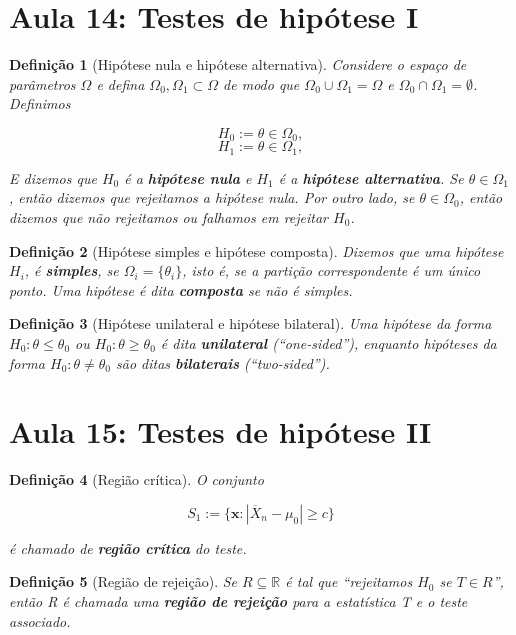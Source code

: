 \documentclass{article}
\newtheorem{definition}{Definição}
\begin{document}
\section*{Aula 14: Testes de hipótese I}
\label{s14}
\begin{definition}[Hipótese nula e hipótese alternativa]
Considere o espaço de parâmetros $\Omega$ e defina $\Omega_0, \Omega_1 \subset \Omega$ de modo que $\Omega_0 \cup \Omega_1 = \Omega$ e $\Omega_0 \cap \Omega_1 = \emptyset$. Definimos

$$H_0 := \theta \in \Omega_0,$$
$$H_1 := \theta \in \Omega_1,$$

E dizemos que $H_0$ é a \textbf{hipótese nula} e $H_1$ é a \textbf{hipótese alternativa}.
Se $\theta \in \Omega_1$, então dizemos que rejeitamos a hipótese nula. Por outro lado, se $\theta \in \Omega_0$, então dizemos que não rejeitamos ou falhamos em rejeitar $H_0$.
\end{definition}

\begin{definition}[Hipótese simples e hipótese composta]
Dizemos que uma hipótese $H_i$, é \textbf{simples}, se $\Omega_i = \{ \theta_i \}$, isto é, se a partição correspondente é um único ponto. Uma hipótese é dita \textbf{composta} se não é simples.
\end{definition}

\begin{definition}[Hipótese unilateral e hipótese bilateral]
Uma hipótese da forma $H_0 : \theta \leq \theta_0$ ou $H_0 : \theta \geq \theta_0$ é dita \textbf{unilateral} (``one-sided''), enquanto hipóteses da forma $H_0 : \theta \neq \theta_0$ são ditas \textbf{bilaterais} (``two-sided'').
\end{definition}

\section*{Aula 15: Testes de hipótese II}
\label{s15}
\begin{definition}[Região crítica]
O conjunto

$$S_1 := \{ \textbf{x} : | \overline{X}_n - \mu_0 | \geq c \}$$

é chamado de \textbf{região crítica} do teste.
\end{definition}

\begin{definition}[Região de rejeição]
Se $R \subseteq \mathbb{R}$ é tal que ``rejeitamos $H_0$ se $T \in R$'', então R é chamada uma \textbf{região de rejeição} para a estatística T e o teste associado.
\end{definition}
\end{document}
